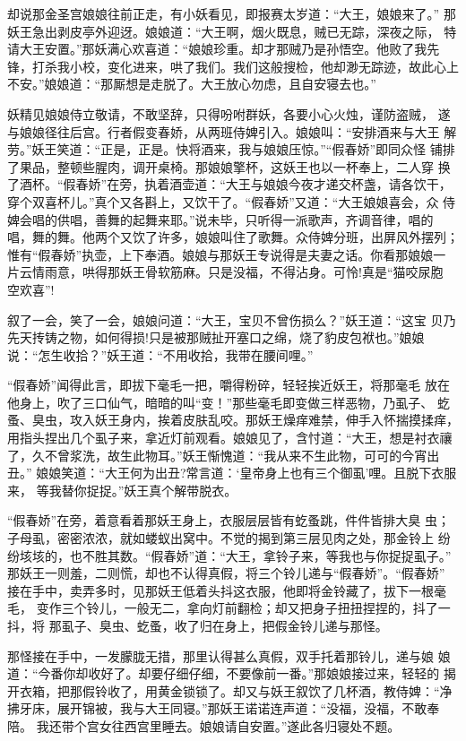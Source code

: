 却说那金圣宫娘娘往前正走，有小妖看见，即报赛太岁道：“大王，娘娘来了。”
那妖王急出剥皮亭外迎迓。娘娘道：“大王啊，烟火既息，贼已无踪，深夜之际，
特请大王安置。”那妖满心欢喜道：“娘娘珍重。却才那贼乃是孙悟空。他败了我先
锋，打杀我小校，变化进来，哄了我们。我们这般搜检，他却渺无踪迹，故此心上
不安。”娘娘道：“那厮想是走脱了。大王放心勿虑，且自安寝去也。”

妖精见娘娘侍立敬请，不敢坚辞，只得吩咐群妖，各要小心火烛，谨防盗贼，
遂与娘娘径往后宫。行者假变春娇，从两班侍婢引入。娘娘叫：“安排酒来与大王
解劳。”妖王笑道：“正是，正是。快将酒来，我与娘娘压惊。”“假春娇”即同众怪
铺排了果品，整顿些腥肉，调开桌椅。那娘娘擎杯，这妖王也以一杯奉上，二人穿
换了酒杯。“假春娇”在旁，执着酒壶道：“大王与娘娘今夜才递交杯盏，请各饮干，
穿个双喜杯儿。”真个又各斟上，又饮干了。“假春娇”又道：“大王娘娘喜会，众
侍婢会唱的供唱，善舞的起舞来耶。”说未毕，只听得一派歌声，齐调音律，唱的
唱，舞的舞。他两个又饮了许多，娘娘叫住了歌舞。众侍婢分班，出屏风外摆列；
惟有“假春娇”执壶，上下奉酒。娘娘与那妖王专说得是夫妻之话。你看那娘娘一
片云情雨意，哄得那妖王骨软筋麻。只是没福，不得沾身。可怜!真是“猫咬尿胞
空欢喜”!

叙了一会，笑了一会，娘娘问道：“大王，宝贝不曾伤损么？”妖王道：“这宝
贝乃先天抟铸之物，如何得损!只是被那贼扯开塞口之绵，烧了豹皮包袱也。”娘娘
说：“怎生收拾？”妖王道：“不用收拾，我带在腰间哩。”

“假春娇”闻得此言，即拔下毫毛一把，嚼得粉碎，轻轻挨近妖王，将那毫毛
放在他身上，吹了三口仙气，暗暗的叫“变！”那些毫毛即变做三样恶物，乃虱子、
虼蚤、臭虫，攻入妖王身内，挨着皮肤乱咬。那妖王燥痒难禁，伸手入怀揣摸揉痒，
用指头捏出几个虱子来，拿近灯前观看。娘娘见了，含忖道：“大王，想是衬衣禳
了，久不曾浆洗，故生此物耳。”妖王惭愧道：“我从来不生此物，可可的今宵出丑。”
娘娘笑道：“大王何为出丑?常言道：‘皇帝身上也有三个御虱’哩。且脱下衣服来，
等我替你捉捉。”妖王真个解带脱衣。

“假春娇”在旁，着意看着那妖王身上，衣服层层皆有虼蚤跳，件件皆排大臭
虫；子母虱，密密浓浓，就如蝼蚁出窝中。不觉的揭到第三层见肉之处，那金铃上
纷纷垓垓的，也不胜其数。“假春娇”道：“大王，拿铃子来，等我也与你捉捉虱子。”
那妖王一则羞，二则慌，却也不认得真假，将三个铃儿递与“假春娇”。“假春娇”
接在手中，卖弄多时，见那妖王低着头抖这衣服，他即将金铃藏了，拔下一根毫毛，
变作三个铃儿，一般无二，拿向灯前翻检；却又把身子扭扭捏捏的，抖了一抖，将
那虱子、臭虫、虼蚤，收了归在身上，把假金铃儿递与那怪。

那怪接在手中，一发朦胧无措，那里认得甚么真假，双手托着那铃儿，递与娘
娘道：“今番你却收好了。却要仔细仔细，不要像前一番。”那娘娘接过来，轻轻的
揭开衣箱，把那假铃收了，用黄金锁锁了。却又与妖王叙饮了几杯酒，教侍婢：“净
拂牙床，展开锦被，我与大王同寝。”那妖王诺诺连声道：“没福，没福，不敢奉陪。
我还带个宫女往西宫里睡去。娘娘请自安置。”遂此各归寝处不题。

